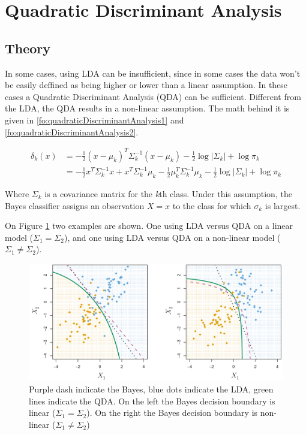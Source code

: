 \section{Quadratic Discriminant Analysis}
\subsection{Theory}
In some cases, using LDA can be insufficient, since in some cases the data won't be easily deffined as being higher or lower than a linear assumption. In these cases a Quadratic Discriminant Analysis (QDA) can be sufficient. Different from the LDA, the QDA results in a non-linear assumption. The math behind it is given in \ref{fo:quadraticDiscriminantAnalysis1} and \ref{fo:quadraticDiscriminantAnalysis2}.

\begin{align}\label{fo:quadraticDiscriminantAnalysis1}
\delta_k(x) &= - \frac{1}{2} (x - \mu_k)^T \Sigma_{k}^{-1} (x - \mu_k) - \frac{1}{2} \log|\Sigma_{k}| + \log\pi_k\\
			\label{fo:quadraticDiscriminantAnalysis2}
			&= - \frac{1}{2} x^T \Sigma_{k}^{-1} x + x^T \Sigma_{k}^{-1} \mu_k - \frac{1}{2} \mu_k^T \Sigma_{k}^{-1} \mu_k - \frac{1}{2} \log|\Sigma_{k}| + \log\pi_k
\end{align}

Where $\Sigma_{k}$ is a covariance matrix for the \textit{k}th class. Under this assumption, the Bayes classifier assigns an observation $X = x$ to the class for which $\sigma_k$ is largest.

On Figure \ref{fig:linearContraQuadratic} two examples are shown. One using LDA versus QDA on a linear model ($\Sigma_{1} = \Sigma_{2}$), and one using LDA versus QDA on a non-linear model ($\Sigma_{1} \neq \Sigma_{2}$).

\begin{figure}[H]
	\centering
	\includegraphics[width=0.7\linewidth]{discriminantAnalysis/quadraticDiscriminantAnalysis/fig/linearContraQuadratic}
	\caption{Purple dash indicate the Bayes, blue dots indicate the LDA, green lines indicate the QDA. On the left the Bayes decision boundary is linear ($\Sigma_{1} = \Sigma_{2}$). On the right the Bayes decision boundary is non-linear ($\Sigma_{1} \neq \Sigma_{2}$)}
	\label{fig:linearContraQuadratic}
\end{figure}

